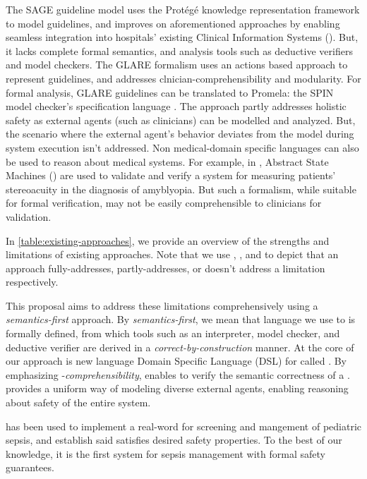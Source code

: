 The SAGE guideline model \cite{TuSAGE04} uses the Prot\'eg\'e knowledge
representation framework \cite{NoyAMIA03} to model guidelines,
and improves on aforementioned approaches by
enabling seamless integration into hospitals' existing Clinical Information Systems
(\CISs). But, it lacks complete formal semantics, and analysis tools
such as deductive verifiers and model checkers.
The GLARE formalism \cite{TerenzianiBook04} uses an actions based approach
to represent guidelines, and addresses clnician-comprehensibility and
modularity. For formal analysis, GLARE guidelines can be translated to
Promela: the SPIN model checker's specification language \cite{GiordanoAMIA06}.
The approach partly addresses holistic safety as
external agents (such as clinicians) can be modelled and analyzed.
But, the scenario where the external agent's behavior
deviates from the model during system execution isn't addressed.
Non medical-domain specific languages can also be used to reason about
medical systems. For example, in \cite{ArcainiMEMCODE15}, Abstract State
Machines (\ASMs) are used to validate and verify a system for measuring
patients' stereoacuity in the diagnosis of amyblyopia. But such a
formalism, while suitable for formal verification, may
not be easily comprehensible to clinicians for validation.

In \tablename{} \ref{table:existing-approaches}, we provide an overview of
the strengths and limitations of existing approaches. Note that we use
\greencheck{}, \cancelcheck{}, and \redcross{} to depict that an approach
fully-addresses, partly-addresses, or doesn't address a limitation respectively.

This proposal aims to address these limitations comprehensively
using a \emph{semantics-first} approach.
By \emph{semantics-first}, we mean that \CIG{} language we
use to is formally defined, from which tools such as an interpreter, model checker,
and deductive verifier are derived in a \emph{correct-by-construction}
manner. At the core of our approach is new language Domain Specific Language (DSL)
for \CIGs{} called \MediK{}. By emphasizing \HCP{}-\emph{comprehensibility},
\MediK{} enables \HCPs{} to verify the semantic correctness of a \CIG{}.
\MediK{} provides a uniform way of modeling diverse external agents, enabling reasoning about
safety of the entire system.

\MediK{} has been used to implement a real-word \CDSS{} for screening and
mangement of pediatric sepsis, and establish said \CDSS{} satisfies desired
safety properties. To the best of our knowledge, it is the first system
for sepsis management with formal safety guarantees.

